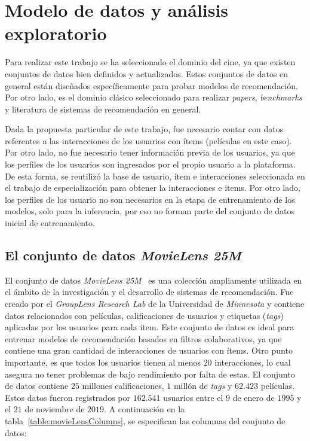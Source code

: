 \documentclass[11pt,a4paper,twoside]{thesis}
\begin{document}
\chapter{Modelo de datos y análisis exploratorio}

Para realizar este trabajo se ha seleccionado el dominio del cine, ya que existen
conjuntos de datos bien definidos y actualizados. Estos conjuntos de datos en
general están diseñados específicamente para probar modelos de recomendación. Por otro lado, es
el dominio clásico seleccionado para realizar \textit{papers}, \textit{benchmarks} y literatura de sistemas de recomendación
en general.

Dada la propuesta particular de este trabajo, fue necesario contar con datos referentes a las
interacciones de los usuarios con ítems (películas en este caso). Por otro lado, no fue necesario tener información previa de los usuarios, ya que los perfiles de los usuarios son ingresados por el propio usuario a la plataforma. De esta forma, se reutilizó la base de usuario, ítem e interacciones seleccionada en el trabajo de especialización \cite{src} para obtener la interacciones e items. Por otro lado, los perfiles de los usuario no son necesarios en la etapa de entrenamiento de los modelos, solo para la inferencia, por eso no forman parte del conjunto de datos inicial de entrenamiento.

\section{El conjunto de datos \textit{MovieLens 25M}}
\label{sec:movielens}

El conjunto de datos \textit{MovieLens 25M}~\cite{movielens} es una colección ampliamente utilizada en el ámbito de la investigación y el desarrollo de sistemas de recomendación. Fue creado por el \textit{GroupLens Research Lab} de la Universidad de \textit{Minnesota} y contiene datos relacionados con películas, calificaciones de usuarios y etiquetas (\textit{tags}) aplicadas por los usuarios para cada item. Este conjunto de datos es ideal para entrenar modelos de recomendación basados en filtros colaborativos, ya que contiene una gran cantidad de interacciones de usuarios con ítems. Otro punto importante, es
que todos los usuarios tienen al menos $20$ interacciones, lo cual asegura no tener problemas de bajo rendimiento por falta de estas. El conjunto de datos contiene $25$ millones calificaciones, $1$ millón de \textit{tags} y $62.423$ películas. Estos datos fueron registrados por $162.541$ usuarios entre el $9$ de enero de $1995$ y el $21$ de noviembre de $2019$. A continuación en la tabla~\ref{table:movieLensColumns}, se especifican las columnas del conjunto de datos:
\end{document}
